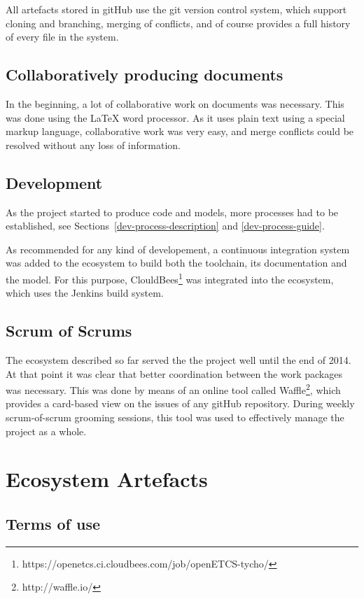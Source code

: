 \documentclass{template/openetcs_report}
\begin{document}
All artefacts stored in gitHub use the git version control system, which support cloning and branching, merging of conflicts, and of course provides a full history of every file in the system.

\section{Collaboratively producing documents}

In the beginning, a lot of collaborative work on documents was necessary. This was done using the \LaTeX{} word processor.  As it uses plain text using a special markup language, collaborative work was very easy, and merge conflicts could be resolved without any loss of information.

\section{Development}

As the project started to produce code and models, more processes had to be established, see Sections~\ref{dev-process-description} and \ref{dev-process-guide}.

As recommended for any kind of developement, a continuous integration system was added to the ecosystem to build both the toolchain, its documentation and the model. For this purpose, ClouldBees\footnote{https://openetcs.ci.cloudbees.com/job/openETCS-tycho/} was integrated into the ecosystem, which uses the Jenkins build system.

\section{Scrum of Scrums}

The ecosystem described so far served the the project well until the end of 2014. At that point it was clear that better coordination between the work packages was necessary. This was done by means of an online tool called Waffle\footnote{http://waffle.io/}, which provides a card-based view on the issues of any gitHub repository. During weekly scrum-of-scrum grooming sessions, this tool was used to effectively manage the project as a whole.

\chapter{Ecosystem Artefacts}


\section{Terms of use}
\label{sec:terms-of-use}
\end{document}
